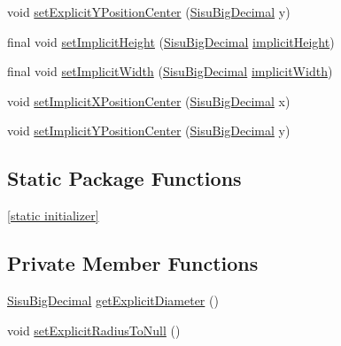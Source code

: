 \begin{DoxyCompactItemize}
\item 
void \hyperlink{classcom_1_1aarrelaakso_1_1drawl_1_1_shape_a0ddc58345fca924e973fac474955ef14}{set\+Explicit\+Y\+Position\+Center} (\hyperlink{classcom_1_1aarrelaakso_1_1drawl_1_1_sisu_big_decimal}{Sisu\+Big\+Decimal} y)
\item 
final void \hyperlink{classcom_1_1aarrelaakso_1_1drawl_1_1_shape_ad41ecfc8ce74638066d8a21c97e3f399}{set\+Implicit\+Height} (\hyperlink{classcom_1_1aarrelaakso_1_1drawl_1_1_sisu_big_decimal}{Sisu\+Big\+Decimal} \hyperlink{classcom_1_1aarrelaakso_1_1drawl_1_1_shape_ab374c520d98692018b1a5866acd33849}{implicit\+Height})
\item 
final void \hyperlink{classcom_1_1aarrelaakso_1_1drawl_1_1_shape_a6ec4c2bd26d08f0a1545bd1d5f47c05a}{set\+Implicit\+Width} (\hyperlink{classcom_1_1aarrelaakso_1_1drawl_1_1_sisu_big_decimal}{Sisu\+Big\+Decimal} \hyperlink{classcom_1_1aarrelaakso_1_1drawl_1_1_shape_a100066b3ccbb6e88080211b00ad8ebb9}{implicit\+Width})
\item 
void \hyperlink{classcom_1_1aarrelaakso_1_1drawl_1_1_shape_a4fbc0d430cfe312e018e4ec58f726842}{set\+Implicit\+X\+Position\+Center} (\hyperlink{classcom_1_1aarrelaakso_1_1drawl_1_1_sisu_big_decimal}{Sisu\+Big\+Decimal} x)
\item 
void \hyperlink{classcom_1_1aarrelaakso_1_1drawl_1_1_shape_ac1cf4cf6f0bcc489b996a10a600d5629}{set\+Implicit\+Y\+Position\+Center} (\hyperlink{classcom_1_1aarrelaakso_1_1drawl_1_1_sisu_big_decimal}{Sisu\+Big\+Decimal} y)
\end{DoxyCompactItemize}
\subsection*{Static Package Functions}
\begin{DoxyCompactItemize}
\item 
\hyperlink{classcom_1_1aarrelaakso_1_1drawl_1_1_shape_ad2adcb85374cf5d6d59429628314e8d1}{\mbox{[}static initializer\mbox{]}}
\end{DoxyCompactItemize}
\subsection*{Private Member Functions}
\begin{DoxyCompactItemize}
\item 
\hyperlink{classcom_1_1aarrelaakso_1_1drawl_1_1_sisu_big_decimal}{Sisu\+Big\+Decimal} \hyperlink{classcom_1_1aarrelaakso_1_1drawl_1_1_circle_ad4037edaf1ef2bfc989cd157b7f90e61}{get\+Explicit\+Diameter} ()
\item 
void \hyperlink{classcom_1_1aarrelaakso_1_1drawl_1_1_circle_aff1c4d184a3234f987a95b673f91bf18}{set\+Explicit\+Radius\+To\+Null} ()
\end{DoxyCompactItemize}
